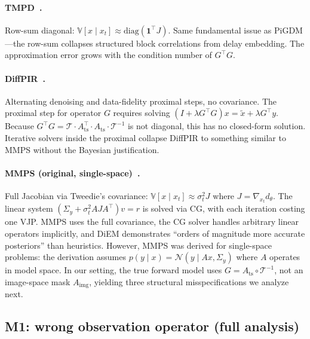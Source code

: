 \documentclass{article}
\theoremstyle{plain}
\theoremstyle{definition}
\theoremstyle{remark}
\newcommand{\tsimg}{\mathcal{T}}
\newcommand{\imgts}{\mathcal{T}^{-1}}
\newcommand{\Ats}{A_{\mathrm{ts}}}
\newcommand{\Aimg}{A_{\mathrm{img}}}
\begin{document}
\paragraph{TMPD~\citep{boys2023tmpd}.}
Row-sum diagonal: $\mathbb{V}[x \mid x_t] \approx \mathrm{diag}(\mathbf{1}^\top J)$. Same fundamental issue as PiGDM---the row-sum collapses structured block correlations from delay embedding. The approximation error grows with the condition number of $G^\top G$.

\paragraph{DiffPIR~\citep{zhu2023diffpir}.}
Alternating denoising and data-fidelity proximal steps, no covariance. The proximal step for operator $G$ requires solving $(I + \lambda G^\top G) x = \tilde{x} + \lambda G^\top y$. Because $G^\top G = \tsimg \cdot \Ats^\top \cdot \Ats \cdot \imgts$ is not diagonal, this has no closed-form solution. Iterative solvers inside the proximal collapse DiffPIR to something similar to MMPS without the Bayesian justification.

\paragraph{MMPS (original, single-space)~\citep{rozet2024diem}.}
Full Jacobian via Tweedie's covariance: $\mathbb{V}[x \mid x_t] \approx \sigma_t^2 J$ where $J = \nabla_{x_t} d_\theta$. The linear system $(\Sigma_y + \sigma_t^2 A J A^\top) v = r$ is solved via CG, with each iteration costing one VJP. MMPS uses the full covariance, the CG solver handles arbitrary linear operators implicitly, and DiEM demonstrates ``orders of magnitude more accurate posteriors'' than heuristics. However, MMPS was derived for single-space problems: the derivation assumes $p(y \mid x) = \mathcal{N}(y \mid Ax, \Sigma_y)$ where $A$ operates in model space. In our setting, the true forward model uses $G = \Ats \circ \imgts$, not an image-space mask $\Aimg$, yielding three structural misspecifications we analyze next.

\subsection{M1: wrong observation operator (full analysis)}
\label{app:M1}
\end{document}
